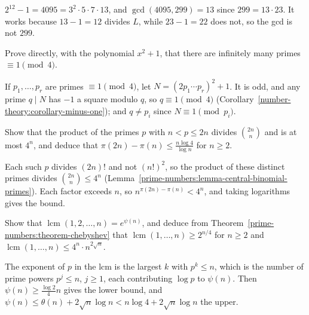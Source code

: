 \begin{solution}
$2^{12} - 1 = 4095 = 3^2 \cdot 5 \cdot 7 \cdot 13$, and $\gcd(4095, 299) = 13$ since $299 = 13 \cdot 23$. It works because $13 - 1 = 12$ divides $L$, while $23 - 1 = 22$ does not, so the gcd is not $299$.
\end{solution}

\begin{exercise}\label{prime-numbers:exercise-one-mod-four-direct}
Prove directly, with the polynomial $x^2 + 1$, that there are infinitely many primes $\equiv 1 \pmod 4$.
\end{exercise}

\begin{solution}
If $p_1, \ldots, p_r$ are primes $\equiv 1 \pmod 4$, let $N = (2p_1 \cdots p_r)^2 + 1$. It is odd, and any prime $q \mid N$ has $-1$ a square modulo $q$, so $q \equiv 1 \pmod 4$
(Corollary~\ref{number-theory:corollary-minus-one}); and $q \neq p_i$ since $N \equiv 1 \pmod{p_i}$.
\end{solution}

\begin{exercise}\label{prime-numbers:exercise-middle-primes}
Show that the product of the primes $p$ with $n < p \leq 2n$ divides $\binom{2n}{n}$ and is at most $4^n$, and deduce that $\pi(2n) - \pi(n) \leq \frac{n\log 4}{\log n}$ for $n \geq 2$.
\end{exercise}

\begin{solution}
Each such $p$ divides $(2n)!$ and not $(n!)^2$, so the product of these distinct primes divides $\binom{2n}{n} \leq 4^n$ (Lemma~\ref{prime-numbers:lemma-central-binomial-primes}). Each factor exceeds $n$,
so $n^{\pi(2n) - \pi(n)} < 4^n$, and taking logarithms gives the bound.
\end{solution}

\begin{exercise}\label{prime-numbers:exercise-lcm}
Show that $\operatorname{lcm}(1, 2, \ldots, n) = e^{\psi(n)}$, and deduce from Theorem~\ref{prime-numbers:theorem-chebyshev} that $\operatorname{lcm}(1, \ldots, n) \geq 2^{n/4}$ for $n \geq 2$ and
$\operatorname{lcm}(1, \ldots, n) \leq 4^n \cdot n^{2\sqrt{n}}$.
\end{exercise}

\begin{solution}
The exponent of $p$ in the lcm is the largest $k$ with $p^k \leq n$, which is the number of prime powers $p^j \leq n$, $j \geq 1$, each contributing $\log p$ to $\psi(n)$. Then
$\psi(n) \geq \frac{\log 2}{4}n$ gives the lower bound, and $\psi(n) \leq \theta(n) + 2\sqrt{n}\log n < n\log 4 + 2\sqrt{n}\log n$ the upper.
\end{solution}

